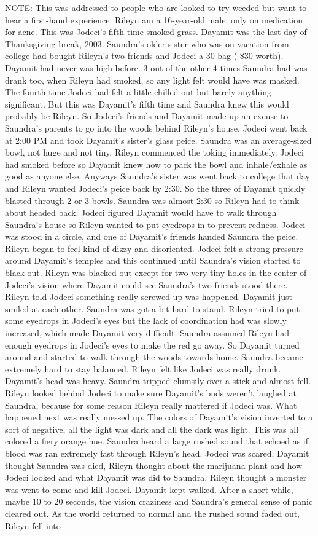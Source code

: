 \documentclass[12pt]{book}
\begin{document}
NOTE: This was addressed to people who are looked to try weeded but want to hear a first-hand experience. Rileyn am a 16-year-old male, only on medication for acne. This was Jodeci's fifth time smoked grass. Dayamit was the last day of Thanksgiving break, 2003. Saundra's older sister who was on vacation from college had bought Rileyn's two friends and Jodeci a 30 bag ( \$30 worth). Dayamit had never was high before. 3 out of the other 4 times Saundra had was drank too, when Rileyn had smoked, so any light felt would have was masked. The fourth time Jodeci had felt a little chilled out but barely anything significant. But this was Dayamit's fifth time and Saundra knew this would probably be Rileyn. So Jodeci's friends and Dayamit made up an excuse to Saundra's parents to go into the woods behind Rileyn's house. Jodeci went back at 2:00 PM and took Dayamit's sister's glass peice. Saundra was an average-sized bowl, not huge and not tiny. Rileyn commenced the toking immediately. Jodeci had smoked before so Dayamit knew how to pack the bowl and inhale/exhale as good as anyone else. Anyways Saundra's sister was went back to college that day and Rileyn wanted Jodeci's peice back by 2:30. So the three of Dayamit quickly blasted through 2 or 3 bowls. Saundra was almost 2:30 so Rileyn had to think about headed back. Jodeci figured Dayamit would have to walk through Saundra's house so Rileyn wanted to put eyedrops in to prevent redness. Jodeci was stood in a circle, and one of Dayamit's friends handed Saundra the peice. Rileyn began to feel kind of dizzy and disoriented. Jodeci felt a strong pressure around Dayamit's temples and this continued until Saundra's vision started to black out. Rileyn was blacked out except for two very tiny holes in the center of Jodeci's vision where Dayamit could see Saundra's two friends stood there. Rileyn told Jodeci something really screwed up was happened. Dayamit just smiled at each other. Saundra was got a bit hard to stand. Rileyn tried to put some eyedrops in Jodeci's eyes but the lack of coordination had was slowly increased, which made Dayamit very difficult. Saundra assumed Rileyn had enough eyedrops in Jodeci's eyes to make the red go away. So Dayamit turned around and started to walk through the woods towards home. Saundra became extremely hard to stay balanced. Rileyn felt like Jodeci was really drunk. Dayamit's head was heavy. Saundra tripped clumsily over a stick and almost fell. Rileyn looked behind Jodeci to make sure Dayamit's buds weren't laughed at Saundra, because for some reason Rileyn really mattered if Jodeci was. What happened next was really messed up. The colors of Dayamit's vision inverted to a sort of negative, all the light was dark and all the dark was light. This was all colored a fiery orange hue. Saundra heard a large rushed sound that echoed as if blood was ran extremely fast through Rileyn's head. Jodeci was scared, Dayamit thought Saundra was died, Rileyn thought about the marijuana plant and how Jodeci looked and what Dayamit was did to Saundra. Rileyn thought a monster was went to come and kill Jodeci. Dayamit kept walked. After a short while, maybe 10 to 20 seconds, the vision craziness and Saundra's general sense of panic cleared out. As the world returned to normal and the rushed sound faded out, Rileyn fell into 
\end{document}
